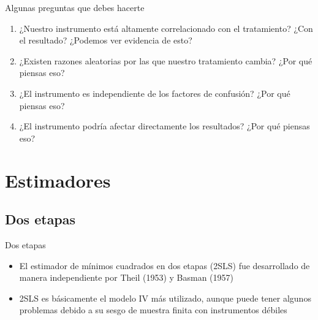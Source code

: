 \documentclass{beamer}
\begin{document}
\begin{frame}{Algunas preguntas que debes hacerte}

\begin{enumerate}
    \item ¿Nuestro instrumento está altamente correlacionado con el tratamiento? ¿Con el resultado? ¿Podemos ver evidencia de esto?
    \item ¿Existen razones aleatorias por las que nuestro tratamiento cambia? ¿Por qué piensas eso?
    \item ¿El instrumento es independiente de los factores de confusión? ¿Por qué piensas eso?
    \item ¿El instrumento podría afectar directamente los resultados? ¿Por qué piensas eso?
\end{enumerate}

\end{frame}

\section{Estimadores}

\subsection{Dos etapas}

\begin{frame}{Dos etapas}

\begin{itemize}
\item El estimador de mínimos cuadrados en dos etapas (2SLS) fue desarrollado de manera independiente por Theil (1953) y Basman (1957)
\item 2SLS es básicamente el modelo IV más utilizado, aunque puede tener algunos problemas debido a su sesgo de muestra finita con instrumentos débiles
\end{itemize}

\end{frame}
\end{document}
